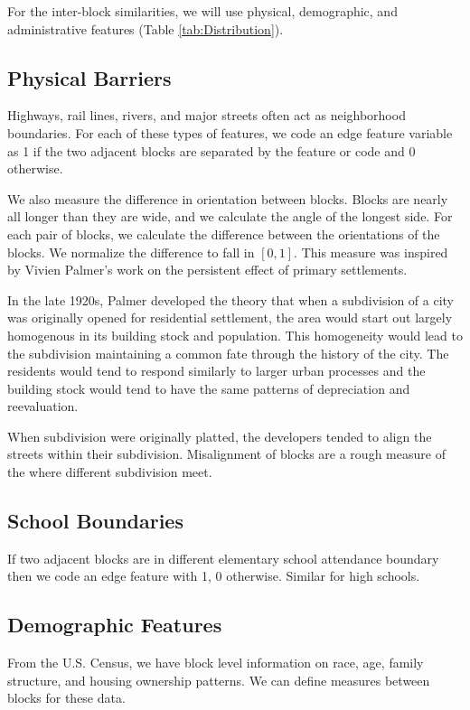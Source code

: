 \documentclass[12pt,letter]{article}\usepackage[]{graphicx}\usepackage[]{color}
\begin{document}
For the inter-block similarities, we will use physical, demographic, and
administrative features (Table \ref{tab:Distribution}).

\subsection*{Physical Barriers}
Highways, rail lines, rivers, and major streets often act as neighborhood
boundaries. For each of these types of features, we code an edge feature
variable as 1 if the two adjacent blocks are separated by the feature or code
and 0 otherwise.

We also measure the difference in orientation between blocks. Blocks
are nearly all longer than they are wide, and we calculate the angle
of the longest side. For each pair of blocks, we calculate the
difference between the orientations of the blocks. We normalize the
difference to fall in $[0, 1]$. This measure was inspired by Vivien
Palmer's work on the persistent effect of primary settlements. 

In the late 1920s, Palmer developed the theory that when a subdivision
of a city was originally opened for residential settlement, the
area would start out largely homogenous in its building stock
and population. This homogeneity would lead to the subdivision
maintaining a common fate through the history of the city. The
residents would tend to respond similarly to larger urban processes
and the building stock would tend to have the same patterns of
depreciation and reevaluation.\cite{palmer_primary_1932}

When subdivision were originally platted, the developers tended to
align the streets within their subdivision. Misalignment of blocks are
a rough measure of the where different subdivision meet. 

\subsection*{School Boundaries}
If two adjacent blocks are in different elementary school attendance boundary
then we code an edge feature with 1, 0 otherwise. Similar for high schools.

\subsection*{Demographic Features}
From the U.S. Census, we have block level information on race, age, family
structure, and housing ownership patterns. We can define measures between
blocks for these data.
\end{document}
